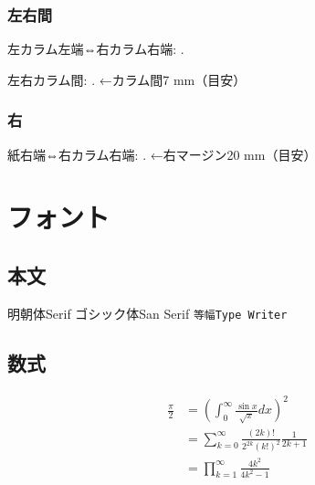 \documentclass{FITpaper}
\begin{document}
\subsubsection{左右間}

左カラム左端⇔右カラム右端:
\prntlen{\textwidth}.

左右カラム間:
\prntlen{\columnsep}.
←カラム間7 mm（目安）

\subsubsection{右}

\newlength{\myright}
\setlength{\myright}{\paperwidth}

\addtolength\myright{-\myleft}
\addtolength\myright{-\textwidth}

紙右端⇔右カラム右端:
\prntlen{\myright}.
←右マージン20 mm（目安）

\section{フォント}

\subsection{本文}

明朝体Serif
\textsf{ゴシック体San Serif}
\texttt{等幅Type Writer}

\subsection{数式}

\begin{align}
  \frac{\pi}{2} &=
  \left( \int_{0}^{\infty} \frac{\sin x}{\sqrt{x}} dx \right)^2 \nonumber \\
  &= \sum_{k=0}^{\infty} \frac{(2k)!}{2^{2k}(k!)^2} \frac{1}{2k+1} \nonumber \\
  &= \prod_{k=1}^{\infty} \frac{4k^2}{4k^2 - 1} \nonumber
\end{align}

\end{document}
